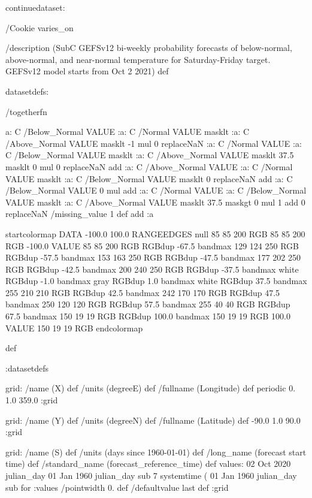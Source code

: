 \begin{ingrid}

continuedataset:



/Cookie varies_on

/description (SubC GEFSv12 bi-weekly probability forecasts of below-normal, above-normal, and near-normal temperature for Saturday-Friday target. GEFSv12 model starts from Oct 2 2021) def

datasetdefs:

/togetherfn {
 a:
    C /Below_Normal VALUE
    :a:
     C /Normal VALUE
     masklt
    :a:
     C /Above_Normal VALUE
     masklt
    -1 mul
    0 replaceNaN
    :a:
     C /Normal VALUE
     :a:
      C /Below_Normal VALUE
      masklt
     :a:
      C /Above_Normal VALUE
      masklt
     37.5 masklt
     0 mul
     0 replaceNaN           
     add
    :a:
     C /Above_Normal VALUE
     :a:
      C /Normal VALUE
      masklt
     :a:
      C /Below_Normal VALUE
      masklt
     0 replaceNaN
     add
 :a:
     C /Below_Normal VALUE
     0 mul
     add
    :a:
     C /Normal VALUE
     :a:
      C /Below_Normal VALUE
      masklt
     :a:
      C /Above_Normal VALUE        
      masklt
     37.5 maskgt
     0 mul
     1 add
     0 replaceNaN
     /missing_value 1 def
     add
    :a

startcolormap
DATA -100.0 100.0 RANGEEDGES
null 85 85 200 RGB
85 85 200 RGB -100.0 VALUE
85 85 200 RGB RGBdup -67.5 bandmax
129 124 250 RGB RGBdup -57.5 bandmax
153 163 250 RGB RGBdup -47.5 bandmax
177 202 250 RGB RGBdup -42.5 bandmax
200 240 250 RGB RGBdup -37.5 bandmax
white RGBdup -1.0 bandmax
gray RGBdup 1.0 bandmax
white RGBdup 37.5 bandmax
255 210 210 RGB RGBdup 42.5 bandmax
242 170 170 RGB RGBdup 47.5 bandmax
250 120 120 RGB RGBdup 57.5 bandmax
255 40 40 RGB RGBdup 67.5 bandmax
150 19 19 RGB RGBdup 100.0 bandmax
150 19 19 RGB 100.0 VALUE
150 19 19 RGB
endcolormap
} def 

:datasetdefs


grid:
/name (X) def
/units (degreeE) def
/fullname (Longitude) def
periodic
0. 1.0 359.0
:grid

grid:
/name (Y) def
/units (degreeN) def
/fullname (Latitude) def
-90.0 1.0 90.0
:grid


grid:
/name (S) def
/units (days since 1960-01-01) def
/long_name (forecast start time) def
/standard_name (forecast_reference_time) def
values:
02 Oct 2020 julian_day 01 Jan 1960 julian_day sub
7
systemtime
(%
01 Jan 1960 julian_day sub
{} for
:values
/pointwidth 0. def
/defaultvalue { last } def
:grid


\end{ingrid}
